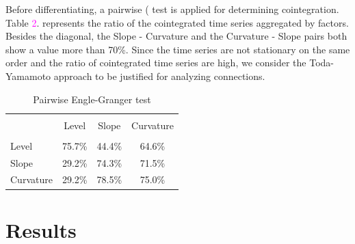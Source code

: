 \documentclass[12pt,bibliography=totoc]{article}
\begin{document}
{Before differentiating, a pairwise  (\cite{engle1987co} test is applied for determining cointegration. Table \textcolor{magenta}{2}. represents the ratio of the cointegrated time series aggregated by factors. Besides the diagonal, the Slope - Curvature and the Curvature - Slope pairs both show a value more than 70\%. Since the time series are not stationary on the same order and the ratio of cointegrated time series are high, we consider the Toda-Yamamoto approach to be justified for analyzing connections.

\begin{table}[H]
\caption{Pairwise Engle-Granger test} %

\centering%
\begin{tabular}{l | ccc}%
\hline\hline \\ [-1.5ex]                         %

	&	Level 	&	Slope	&	Curvature	\\
\hline \\ [-1.5ex]  
Level	&	75.7\%	&	44.4\%	&	64.6\%	\\
Slope	&	29.2\%	&	74.3\%	&	71.5\%	\\
Curvature	&	29.2\%	&	78.5\%	&	75.0\%	\\

\hline            





\end{tabular}
\label{table:nonlin}%
\end{table}



\newpage

\section{Results}

}
\end{document}
